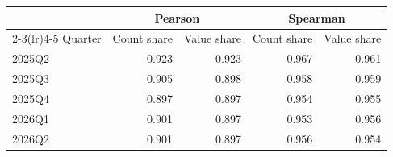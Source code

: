 \begin{tabular}{lrrrr}
\toprule
 & \multicolumn{2}{c}{Pearson} & \multicolumn{2}{c}{Spearman} \\
\cmidrule(lr){2-3}\cmidrule(lr){4-5}
Quarter & Count share & Value share & Count share & Value share \\
\midrule
2025Q2 & 0.923 & 0.923 & 0.967 & 0.961 \\
2025Q3 & 0.905 & 0.898 & 0.958 & 0.959 \\
2025Q4 & 0.897 & 0.897 & 0.954 & 0.955 \\
2026Q1 & 0.901 & 0.897 & 0.953 & 0.956 \\
2026Q2 & 0.901 & 0.897 & 0.956 & 0.954 \\
\bottomrule
\end{tabular}
